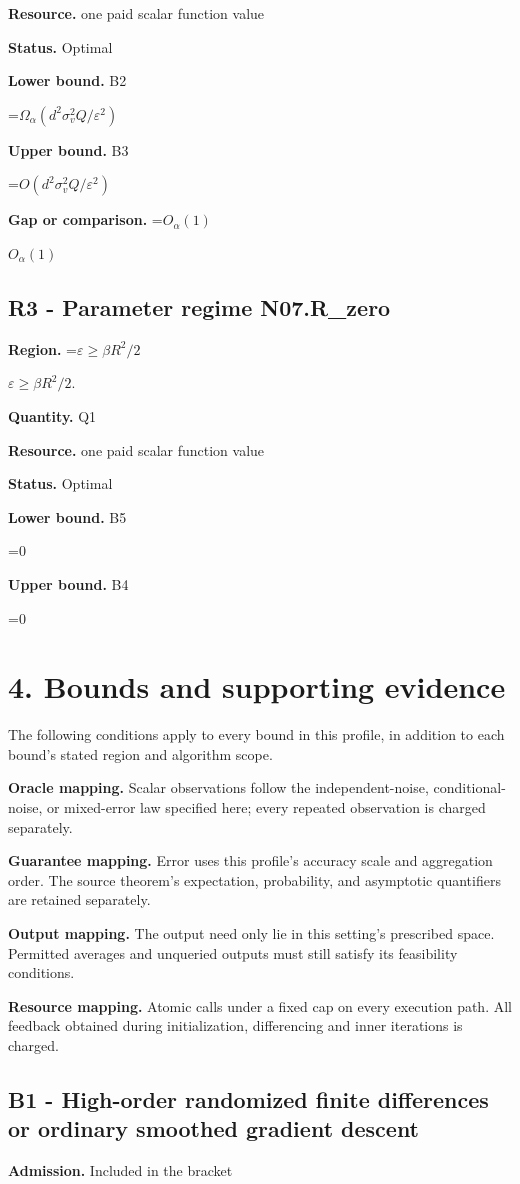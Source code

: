 \documentclass[10pt,a4paper]{article}
\newcommand{\AtlasMath}[1]{\par\begingroup\centering\setbox0=\hbox{$\displaystyle #1$}\ifdim\wd0>1.4\linewidth\typeout{ATLAS WIDE FORMULA: \the\wd0}\fi\ifdim\wd0>\linewidth\resizebox{\linewidth}{!}{\box0}\else\box0\fi\par\endgroup}
\newcommand{\AtlasInlineMath}[1]{\begingroup\setbox0=\hbox{$#1$}\ifdim\wd0>.4\linewidth\endgroup\AtlasMath{#1}\else\endgroup$#1$\fi}
\begin{document}
\textbf{Resource.} one paid scalar function value

\textbf{Status.} Optimal

\textbf{Lower bound.} B2

\AtlasMath{\Omega_\alpha(d^2\sigma_v^2 Q/\varepsilon^2)}
\textbf{Upper bound.} B3

\AtlasMath{O(d^2\sigma_v^2 Q/\varepsilon^2)}
\textbf{Gap or comparison.} \AtlasInlineMath{O_\alpha(1)}

\subsection{R3 - Parameter regime N07.R\_zero}
\textbf{Region.} \AtlasInlineMath{\varepsilon\ge\beta R^2/2}.

\textbf{Quantity.} Q1

\textbf{Resource.} one paid scalar function value

\textbf{Status.} Optimal

\textbf{Lower bound.} B5

\AtlasMath{0}
\textbf{Upper bound.} B4

\AtlasMath{0}
\section{4. Bounds and supporting evidence}
The following conditions apply to every bound in this profile, in addition to each bound's stated region and algorithm scope.

\textbf{Oracle mapping.} Scalar observations follow the independent-noise, conditional-noise, or mixed-error law specified here; every repeated observation is charged separately.

\textbf{Guarantee mapping.} Error uses this profile's accuracy scale and aggregation order. The source theorem's expectation, probability, and asymptotic quantifiers are retained separately.

\textbf{Output mapping.} The output need only lie in this setting's prescribed space. Permitted averages and unqueried outputs must still satisfy its feasibility conditions.

\textbf{Resource mapping.} Atomic calls under a fixed cap on every execution path. All feedback obtained during initialization, differencing and inner iterations is charged.

\subsection{B1 - High-order randomized finite differences or ordinary smoothed gradient descent}
\textbf{Admission.} Included in the bracket
\end{document}
